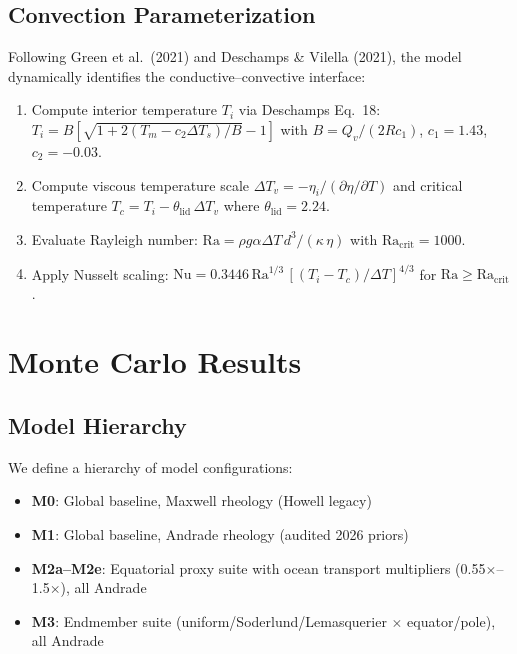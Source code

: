 \documentclass[11pt,letterpaper]{article}
\begin{document}
\subsection{Convection Parameterization}

Following Green et al.\ (2021) and Deschamps \& Vilella (2021), the model dynamically identifies the conductive--convective interface:

\begin{enumerate}[nosep]
  \item Compute interior temperature $T_i$ via Deschamps Eq.~18: $T_i = B[\sqrt{1 + 2(T_m - c_2\Delta T_s)/B} - 1]$ with $B = Q_v/(2Rc_1)$, $c_1 = 1.43$, $c_2 = -0.03$.
  \item Compute viscous temperature scale $\Delta T_v = -\eta_i/(\partial\eta/\partial T)$ and critical temperature $T_c = T_i - \theta_\mathrm{lid}\,\Delta T_v$ where $\theta_\mathrm{lid} = 2.24$.
  \item Evaluate Rayleigh number: $\mathrm{Ra} = \rho g \alpha \Delta T\,d^3/(\kappa\,\eta)$ with $\mathrm{Ra_{crit}} = 1000$.
  \item Apply Nusselt scaling: $\mathrm{Nu} = 0.3446\,\mathrm{Ra}^{1/3}\,[(T_i - T_c)/\Delta T]^{4/3}$ for $\mathrm{Ra} \geq \mathrm{Ra_{crit}}$.
\end{enumerate}


\section{Monte Carlo Results}
\label{sec:results}

\subsection{Model Hierarchy}

We define a hierarchy of model configurations:

\begin{itemize}[nosep]
  \item \textbf{M0}: Global baseline, Maxwell rheology (Howell legacy)
  \item \textbf{M1}: Global baseline, Andrade rheology (audited 2026 priors)
  \item \textbf{M2a--M2e}: Equatorial proxy suite with ocean transport multipliers (0.55$\times$--1.5$\times$), all Andrade
  \item \textbf{M3}: Endmember suite (uniform/Soderlund/Lemasquerier $\times$ equator/pole), all Andrade
\end{itemize}
\end{document}
